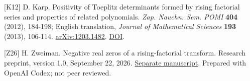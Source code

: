 \documentclass[11pt]{article}
\begin{document}
{[}K12{]} D. Karp. Positivity of Toeplitz determinants formed by rising
factorial series and properties of related polynomials. \emph{Zap.
Nauchn. Sem. POMI} \textbf{404} (2012), 184-198; English translation,
\emph{Journal of Mathematical Sciences} \textbf{193} (2013), 106-114.
\href{https://arxiv.org/abs/1203.1482}{arXiv:1203.1482}.
\href{https://doi.org/10.1007/s10958-013-1438-y}{DOI}.

{[}Z26{]} H. Zweiman. Negative real zeros of a rising-factorial
transform. Research preprint, version 1.0, September 22, 2026.
\href{https://github.com/Hwzw/algebra-number-theory-drafts/tree/main/papers/P56-karp-rising-factorial-zeros}{Separate
manuscript}. Prepared with OpenAI Codex; not peer reviewed.
\end{document}
